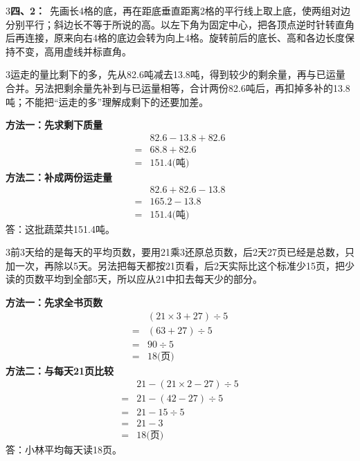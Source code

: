 \documentclass[multi=snippet,border={5bp 20bp 5bp 5bp}]{standalone}
\newenvironment{snippet}[3]{\begin{minipage}{#1bp}\color{answerred}\fontsize{#2}{#3}\selectfont\raggedright}{\end{minipage}}
\begin{document}
\begin{snippet}{505}{11.5}{14}\begin{multicols}{3}\raggedcolumns \textbf{四、2：}\ 先画长4格的底，再在距底垂直距离2格的平行线上取上底，使两组对边分别平行；斜边长不等于所说的高。以左下角为固定中心，把各顶点逆时针转直角后再连接，原来向右4格的底边会转为向上4格。旋转前后的底长、高和各边长度保持不变，高用虚线并标直角。\end{multicols}\end{snippet}
\begin{snippet}{505}{11.5}{14}\begin{multicols}{3}\raggedcolumns 运走的量比剩下的多，先从82.6吨减去13.8吨，得到较少的剩余量，再与已运量合并。另法把剩余量先补到与已运量相等，合计两份82.6吨后，再扣掉多补的13.8吨；不能把“运走的多”理解成剩下的还要加差。\par \textbf{方法一：先求剩下质量}\[\begin{aligned} &82.6-13.8+82.6\\={}&68.8+82.6\\={}&151.4\text{(吨)}\end{aligned}\]\textbf{方法二：补成两份运走量}\[\begin{aligned} &82.6+82.6-13.8\\={}&165.2-13.8\\={}&151.4\text{(吨)}\end{aligned}\]答：这批蔬菜共151.4吨。\end{multicols}\end{snippet}
\begin{snippet}{505}{11.5}{14}\begin{multicols}{3}\raggedcolumns 前3天给的是每天的平均页数，要用21乘3还原总页数，后2天27页已经是总数，只加一次，再除以5天。另法把每天都按21页看，后2天实际比这个标准少15页，把少读的页数平均到全部5天，所以应从21中扣去每天少的部分。\par \textbf{方法一：先求全书页数}\[\begin{aligned} &(21\times3+27)\div5\\={}&(63+27)\div5\\={}&90\div5\\={}&18\text{(页)}\end{aligned}\]\textbf{方法二：与每天21页比较}\[\begin{aligned} &21-(21\times2-27)\div5\\={}&21-(42-27)\div5\\={}&21-15\div5\\={}&21-3\\={}&18\text{(页)}\end{aligned}\]答：小林平均每天读18页。\end{multicols}\end{snippet}
\end{document}
